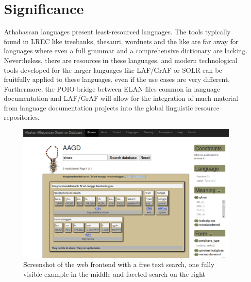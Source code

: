 \documentclass[a4paper,11pt]{article}
\begin{document}
\section{Significance}
Athabascan languages present least-resourced languages. The tools typically found in LREC like treebanks, thesauri, wordnets and the like are far away for languages where even a full grammar and a comprehensive dictionary are lacking. Nevertheless, there are resources in these languages, and modern technological tools developed for the larger languages like LAF/GrAF or SOLR can be fruitfully applied to these languages, even if the use cases are very different. Furthermore, the POIO bridge between ELAN files common in language documentation and LAF/GrAF will allow for the integration of much material from language documentation projects into the global linguistic resource repositories. 
\onecolumn

\printbibliography
\begin{figure}[t]
\includegraphics[width=\textwidth]{aagd.png}
\caption{Screenshot of the web frontend with a free text search, one fully visible example in the middle and faceted search on the right}
\end{figure}
\end{document}
